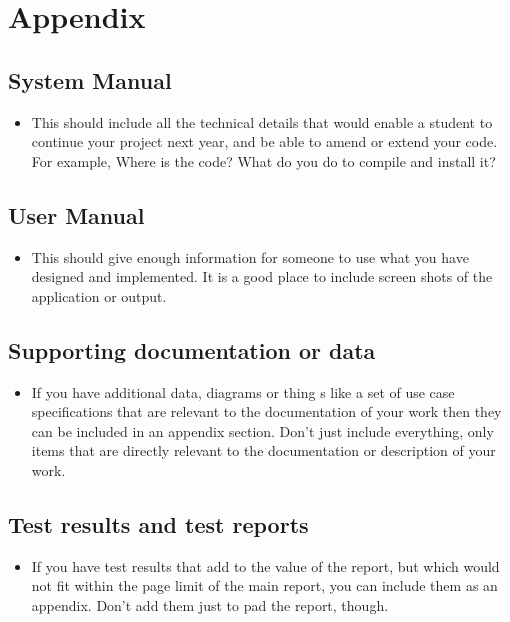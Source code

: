 \section{Appendix}
\label{sec:appendix}


\subsection{System Manual}

\begin{itemize}
	\item This should include all the technical details that would enable a student to continue your project next year, and be able to amend or extend your code. For example, Where is the code? What do you do to compile and install it?
\end{itemize}


\subsection{User Manual}

\begin{itemize}
	\item This should give enough information for someone to use what you have designed and implemented. It is a good place to include screen shots of the application or output.
\end{itemize}

\subsection{Supporting documentation or data}

\begin{itemize}
	\item If you have additional data, diagrams or thing s like a set of use case specifications that are relevant to the documentation of your work then they can be included in an appendix section. Don't just include everything, only items that are directly relevant to the documentation or description of your work.
\end{itemize}

\subsection{Test results and test reports}

\begin{itemize}
	\item If you have test results that add to the value of the report, but which would not fit within the page limit of the main report, you can include them as an appendix. Don't add them just to pad the report, though.
\end{itemize}

